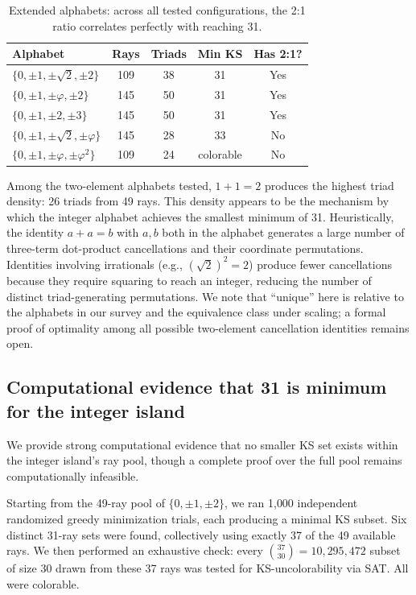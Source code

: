 \documentclass[12pt,a4paper]{article}
\begin{document}
\begin{table}[ht]
\centering
\caption{Extended alphabets: across all tested configurations, the 2:1 ratio correlates perfectly with reaching 31.}
\label{tab:extended}
\begin{tabular}{lcccc}
\toprule
Alphabet & Rays & Triads & Min KS & Has 2:1? \\
\midrule
$\{0,\pm 1,\pm\sqrt{2},\pm 2\}$ & 109 & 38 & 31 & Yes \\
$\{0,\pm 1,\pm\varphi,\pm 2\}$ & 145 & 50 & 31 & Yes \\
$\{0,\pm 1,\pm 2,\pm 3\}$ & 145 & 50 & 31 & Yes \\
$\{0,\pm 1,\pm\sqrt{2},\pm\varphi\}$ & 145 & 28 & 33 & No \\
$\{0,\pm 1,\pm\varphi,\pm\varphi^2\}$ & 109 & 24 & colorable & No \\
\bottomrule
\end{tabular}
\end{table}

Among the two-element alphabets tested, $1 + 1 = 2$ produces the highest triad density: 26 triads from 49 rays. This density appears to be the mechanism by which the integer alphabet achieves the smallest minimum of 31. Heuristically, the identity $a + a = b$ with $a, b$ both in the alphabet generates a large number of three-term dot-product cancellations and their coordinate permutations. Identities involving irrationals (e.g., $(\sqrt{2})^2 = 2$) produce fewer cancellations because they require squaring to reach an integer, reducing the number of distinct triad-generating permutations. We note that ``unique'' here is relative to the alphabets in our survey and the equivalence class under scaling; a formal proof of optimality among all possible two-element cancellation identities remains open.

\subsection{Computational evidence that 31 is minimum for the integer island}\label{sec:exhaustive}

We provide strong computational evidence that no smaller KS set exists within the integer island's ray pool, though a complete proof over the full pool remains computationally infeasible.

Starting from the 49-ray pool of $\{0, \pm 1, \pm 2\}$, we ran 1{,}000 independent randomized greedy minimization trials, each producing a minimal KS subset. Six distinct 31-ray sets were found, collectively using exactly 37 of the 49 available rays. We then performed an exhaustive check: every $\binom{37}{30} = 10{,}295{,}472$ subset of size 30 drawn from these 37 rays was tested for KS-uncolorability via SAT. All were colorable.
\end{document}
